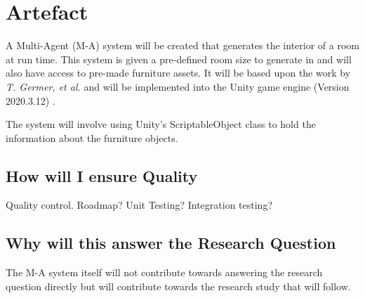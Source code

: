 \section{Artefact}

A Multi-Agent (M-A) system will be created that generates the interior of a room at run time. This system is given a pre-defined room size to generate in and will also have access to pre-made furniture assets. It will be based upon the work by \textit{T. Germer, et al.} \cite{real-time-walkthroughs} and will be implemented into the Unity game engine (Version 2020.3.12) \cite{unity}.

The system will involve using Unity's ScriptableObject class to hold the information about the furniture objects.



\subsection{How will I ensure Quality}
Quality control. Roadmap? Unit Testing? Integration testing?

\subsection{Why will this answer the Research Question}
The M-A system itself will not contribute towards answering the research question directly but will contribute towards the research study that will follow. 

